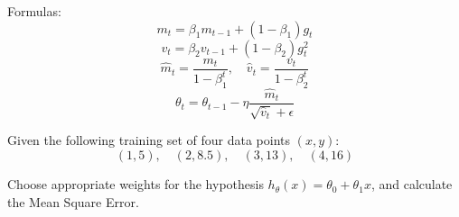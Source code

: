\documentclass[12pt]{exam}
\begin{document}
\begin{questions}
Formulas:
\[ m_t = \beta_1 m_{t-1} + (1 - \beta_1) g_t \]
\[ v_t = \beta_2 v_{t-1} + (1 - \beta_2) g_t^2 \]
\[ \hat{m}_t = \frac{m_t}{1 - \beta_1^t}, \quad \hat{v}_t = \frac{v_t}{1 - \beta_2^t} \]
\[ \theta_t = \theta_{t-1} - \eta \frac{\hat{m}_t}{\sqrt{\hat{v}_t} + \epsilon} \]

\question[6] Given the following training set of four data points $(x, y)$:
\[ (1, 5), \quad (2, 8.5), \quad (3, 13), \quad (4, 16) \]

Choose appropriate weights for the  hypothesis $h_\theta(x) = \theta_0 + \theta_1 x$, and calculate the Mean Square Error.
\end{questions}


\end{document}
